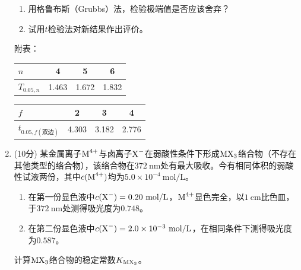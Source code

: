 \begin{enumerate}[label=\arabic*., itemsep=1.5ex]
\begin{enumerate}[label=(\arabic*), noitemsep, topsep=0pt, partopsep=0pt]
        \item 用格鲁布斯（Grubbs）法，检验极端值是否应该舍弃？
        \item 试用$t$检验法对新结果作出评价。
    \end{enumerate}
    附表：
    \begin{center}
    \begin{tabular}{l|ccc}
    $n$ & 4 & 5 & 6 \\
    \hline
    $T_{0.05,n}$ & 1.463 & 1.672 & 1.832 \\
    \end{tabular}
    \begin{tabular}{l|ccc}
    $f$ & 2 & 3 & 4 \\
    \hline
    $t_{0.05,f(\text{双边})}$ & 4.303 & 3.182 & 2.776 \\
    \end{tabular}
    \end{center}
    \item (10分) 某金属离子$\ce{M^{4+}}$与卤离子$\ce{X-}$在弱酸性条件下形成$\ce{MX3}$络合物（不存在其他类型的络合物），该络合物在$372\ \mathrm{nm}$处有最大吸收。今有相同体积的弱酸性试液两份，其中$c(\ce{M^{4+}})$均为$5.0\times10^{-4}\ \mathrm{mol/L}$。
    \begin{enumerate}[label=(\arabic*), noitemsep, topsep=0pt, partopsep=0pt]
        \item 在第一份显色液中$c(\ce{X-})=0.20\ \mathrm{mol/L}$，$\ce{M^{4+}}$显色完全，以$1\ \mathrm{cm}$比色皿，于$372\ \mathrm{nm}$处测得吸光度为$0.748$。
        \item 在第二份显色液中$c(\ce{X-})=2.0\times10^{-3}\ \mathrm{mol/L}$，在相同条件下测得吸光度为$0.587$。
    \end{enumerate}
    计算$\ce{MX3}$络合物的稳定常数$K_{\ce{MX3}}$。
\end{enumerate}
